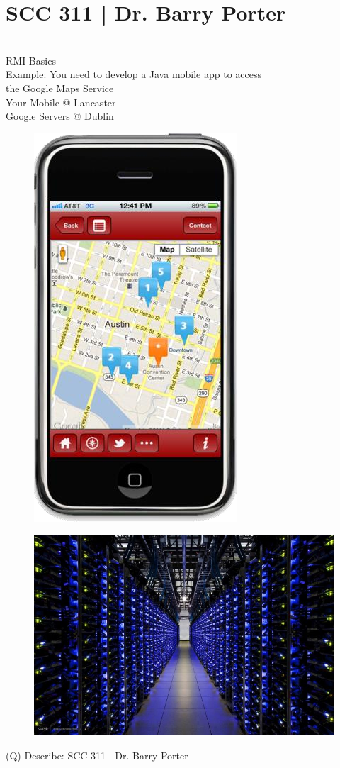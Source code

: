 \documentclass[12pt]{article}
\begin{document}
\section{SCC 311 | Dr. Barry Porter}
\\
RMI Basics\\
Example: You need to develop a Java mobile app to access \\
the Google Maps Service\\
Your Mobile @ Lancaster\\
Google Servers @ Dublin\\
\begin{figure}[H]
\includegraphics[width=0.5\linewidth]{page25-image-1.png}
\end{figure}
\begin{figure}[H]
\includegraphics[width=0.5\linewidth]{page25-image-2.png}
\end{figure}
\clearpage
(Q)
Describe: SCC 311 | Dr. Barry Porter
\clearpage
\end{document}
